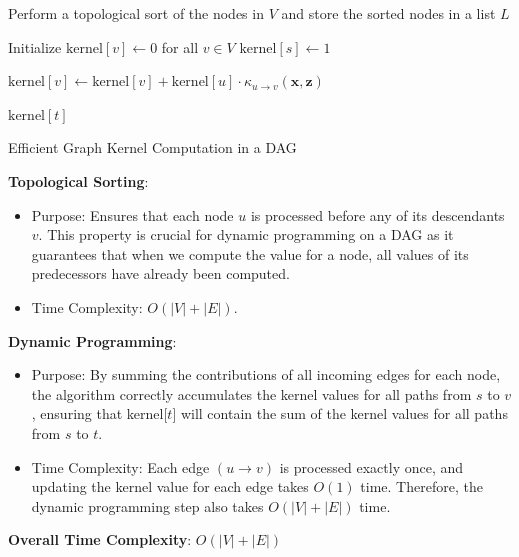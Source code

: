 \documentclass[10pt]{article}
\newcommand{\xv}{\mathbf{x}}
\newcommand{\zv}{\mathbf{z}}
\begin{document}
\begin{exercise}
\begin{enumerate}
\begin{algorithm}[H]
			      Perform a topological sort of the nodes in $V$ and store the sorted nodes in a list $L$\;

			      Initialize $\text{kernel}[v] \gets 0$ for all $v \in V$\;
			      $\text{kernel}[s] \gets 1$

			       {
				       {
					      $\text{kernel}[v] \gets \text{kernel}[v] + \text{kernel}[u] \cdot \kappa_{u \to v}(\xv, \zv)$\;
				      }
			      }

			      \Return $\text{kernel}[t]$
			      \caption{Efficient Graph Kernel Computation in a DAG}
			      \label{alg:graph_kernel}
		      \end{algorithm}
		      \textbf{Topological Sorting}:
		      \begin{itemize}
			      \item Purpose: Ensures that each node $u$ is processed before any of its descendants $v$. This property is crucial for dynamic programming on a DAG as it guarantees that when we compute the value for a node, all values of its predecessors have already been computed.
			      \item Time Complexity: $O(|V| + |E|)$.
		      \end{itemize}

		      \textbf{Dynamic Programming}:
		      \begin{itemize}
			      \item Purpose: By summing the contributions of all incoming edges for each node, the algorithm correctly accumulates the kernel values for all paths from $s$ to $v$, ensuring that kernel[$t$] will contain the sum of the kernel values for all paths from $s$ to $t$.
			      \item Time Complexity: Each edge $(u \to v)$ is processed exactly once, and updating the kernel value for each edge takes $O(1)$ time. Therefore, the dynamic programming step also takes $O(|V| + |E|)$ time.
		      \end{itemize}

		      \textbf{Overall Time Complexity}: $O(|V| + |E|)$
	\end{enumerate}
\end{exercise}
\end{document}
